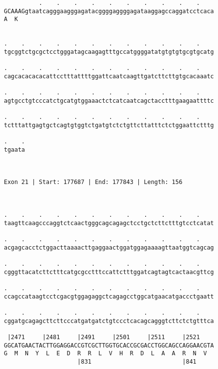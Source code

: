 \documentclass{article}
\begin{document}
\begin{Verbatim}
          .    .    .    .    .    .    .    .    .    .    
GCAAAGgtaatcagggaagggagatacggggaggggagataaggagccaggatcctcaca
A  K                                                        
                                                            
  
.    .    .    .    .    .    .    .    .    .    .    .    
tgcggtctgcgctcctgggatagcaagagtttgccatggggatatgtgtgtgcgtgcatg
                                                            
.    .    .    .    .    .    .    .    .    .    .    .    
cagcacacacacattcctttattttggattcaatcaagttgatcttcttgtgcacaaatc
                                                            
.    .    .    .    .    .    .    .    .    .    .    .    
agtgcctgtcccatctgcatgtggaaactctcatcaatcagctacctttgaagaattttc
                                                            
.    .    .    .    .    .    .    .    .    .    .    .    
tctttattgagtgctcagtgtggtctgatgtctctgttcttatttctctggaattctttg
                                                            
.    .
tgaata
      
      
 
Exon 21 | Start: 177687 | End: 177843 | Length: 156



.    .    .    .    .    .    .    .    .    .    .    .    
taagttcaagcccaggtctcaactgggcagcagagctcctgctcttctttgtcctcatat
                                                            
.    .    .    .    .    .    .    .    .    .    .    .    
acgagcacctctggacttaaaacttgaggaactggatggagaaaagttaatggtcagcag
                                                            
.    .    .    .    .    .    .    .    .    .    .    .    
cgggttacatcttctttcatgcgcctttccattctttggatcagtagtcactaacgttcg
                                                            
.    .    .    .    .    .    .    .    .    .    .    .    
ccagccataagtcctcgacgtggagaggctcagagcctggcatgaacatgaccctgaatt
                                                            
.    .    .    .    .    .    .    .    .    .    .    .    
cggatgcagagcttcttcccatgatgatctgtccctcacagcagggtcttctctgtttca
                                                            
 |2471     |2481     |2491     |2501     |2511     |2521    
GGCATGAACTACTTGGAGGACCGTCGCTTGGTGCACCGCGACCTGGCAGCCAGGAACGTA
G  M  N  Y  L  E  D  R  R  L  V  H  R  D  L  A  A  R  N  V  
                     |831                          |841     
  

\end{Verbatim}
\end{document}
